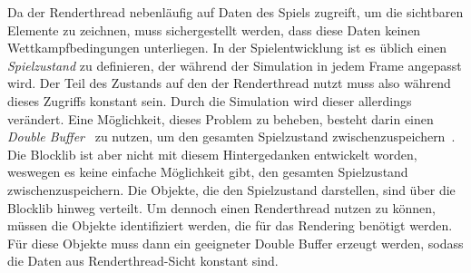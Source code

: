 Da der Renderthread nebenläufig auf Daten des Spiels zugreift, um die sichtbaren Elemente zu zeichnen, muss sichergestellt werden, dass diese Daten keinen Wettkampfbedingungen unterliegen. In der Spielentwicklung ist es üblich einen \emph{Spielzustand} zu definieren, der während der Simulation in jedem Frame angepasst wird. Der Teil des Zustands auf den der Renderthread nutzt muss also während dieses Zugriffs konstant sein. Durch die Simulation wird dieser allerdings verändert. Eine Möglichkeit, dieses Problem zu beheben, besteht darin einen \emph{Double Buffer}~\cite[S.~143]{Nystrom2015} zu nutzen, um den gesamten Spielzustand zwischenzuspeichern~\cite{Tatarchuk2014}. Die Blocklib ist aber nicht mit diesem Hintergedanken entwickelt worden, weswegen es keine einfache Möglichkeit gibt, den gesamten Spielzustand zwischenzuspeichern. Die Objekte, die den Spielzustand darstellen, sind über die Blocklib hinweg verteilt. Um dennoch einen Renderthread nutzen zu können, müssen die Objekte identifiziert werden, die für das Rendering benötigt werden. Für diese Objekte muss dann ein geeigneter Double Buffer erzeugt werden, sodass die Daten aus Renderthread-Sicht konstant sind.


